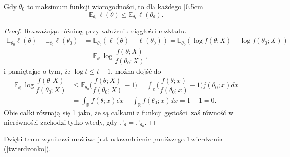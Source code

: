 \begin{lemma}\label{l:pierwszy}
Gdy $\theta_0$ to maksimum funkcji wiarogodności, to dla każdego \text{$\theta \in \Theta$}
[0.5cm]
\begin{equation*}
\mathbb{E}_{\theta_0}\ell(\theta) \leq \mathbb{E}_{\theta_0}\ell(\theta_0).
\end{equation*}
\end{lemma}

\begin{proof}
Rozważając różnicę, przy założeniu ciągłości rozkładu:
\begin{equation*}
\begin{split}
\mathbb{E}_{\theta_0}\ell(\theta) - \mathbb{E}_{\theta_0}\ell(\theta_0) & = \mathbb{E}_{\theta_0}(\ell(\theta) - \ell(\theta_0) ) = \mathbb{E}_{\theta_0}(\log f(\theta; X) - \log f(\theta_0; X)) \\
 & = \mathbb{E}_{\theta_0}\log\dfrac{f(\theta; X)}{f(\theta_0; X)},
\end{split}
\end{equation*}
i pamiętając o tym, że $\log t \leq t - 1$, można dojść do
\begin{equation*}
\begin{split}
\mathbb{E}_{\theta_0}\log\dfrac{f(\theta; X)}{f(\theta_0; X)} & \leq \mathbb{E}_{\theta_0}\Big(\dfrac{f(\theta; X)}{f(\theta_0; X)} - 1 \Big) = \int_{\mathbb{R}} \Big(\dfrac{f(\theta; x)}{f(\theta_0; x)} - 1 \Big) f(\theta_0;x) dx \\ 
& = \int_{\mathbb{R}} f(\theta;x)dx - \int_{\mathbb{R}} f(\theta_0;x)dx = 1-1 =0.
\end{split}
\end{equation*}
Obie całki równają się 1 jako, że są całkami z funkcji gęstości, zaś równość w nierówności zachodzi tylko wtedy, gdy  $\mathbb{P}_{\theta}=\mathbb{P}_{\theta_0}$.
\end{proof}

Dzięki temu wynikowi możliwe jest udowodnienie poniższego Twierdzenia (\ref{twierdzonko}).

